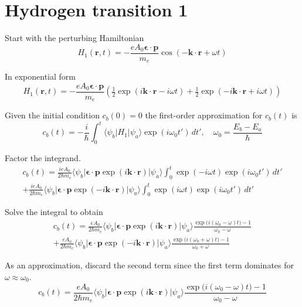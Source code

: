 

\section*{Hydrogen transition 1}

Start with the perturbing Hamiltonian
\begin{equation*}
H_1(\mathbf r,t)=-\frac{eA_0\boldsymbol{\epsilon}\cdot\mathbf p}{m_e}
\cos(-\mathbf k\cdot\mathbf r+\omega t)
\end{equation*}

In exponential form
\begin{equation*}
H_1(\mathbf r,t)=-\frac{eA_0\boldsymbol{\epsilon}\cdot\mathbf p}{m_e}
\left(\tfrac{1}{2}\exp(i\mathbf k\cdot\mathbf r-i\omega t)
+\tfrac{1}{2}\exp(-i\mathbf k\cdot\mathbf r+i\omega t)\right)
\end{equation*}

Given the initial condition $c_b(0)=0$ the first-order approximation for $c_b(t)$ is
\begin{equation*}
c_b(t)=-\frac{i}{\hbar}\int_0^t
\langle\psi_b|H_1|\psi_a\rangle\exp(i\omega_0t')\,dt',\quad
\omega_0=\frac{E_b-E_a}{\hbar}
\end{equation*}

Factor the integrand.
\begin{multline*}
c_b(t)
=\frac{ieA_0}{2\hbar m_e}
\langle\psi_b|\boldsymbol{\epsilon}\cdot\mathbf p\exp(i\mathbf k\cdot\mathbf r)|\psi_a\rangle
\int_0^t\exp(-i\omega t)\exp(i\omega_0t')\,dt'
\\
+\frac{ieA_0}{2\hbar m_e}
\langle\psi_b|\boldsymbol{\epsilon}\cdot\mathbf p\exp(-i\mathbf k\cdot\mathbf r)|\psi_a\rangle
\int_0^t\exp(i\omega t)\exp(i\omega_0t')\,dt'
\end{multline*}

Solve the integral to obtain
\begin{multline*}
c_b(t)=\frac{eA_0}{2\hbar m_e}
\langle\psi_b|\boldsymbol{\epsilon}\cdot\mathbf p\exp(i\mathbf k\cdot\mathbf r)|\psi_a\rangle
\frac{\exp\bigl(i(\omega_0-\omega)t\bigr)-1}{\omega_0-\omega}
\\
+\frac{eA_0}{2\hbar m_e}
\langle\psi_b|\boldsymbol{\epsilon}\cdot\mathbf p\exp(-i\mathbf k\cdot\mathbf r)|\psi_a\rangle
\frac{\exp\bigl(i(\omega_0+\omega)t\bigr)-1}{\omega_0+\omega}
\tag{1}
\end{multline*}

As an approximation, discard the second term since the first term
dominates for $\omega\approx\omega_0$.
\begin{equation*}
c_b(t)=\frac{eA_0}{2\hbar m_e}
\langle\psi_b|\boldsymbol{\epsilon}\cdot\mathbf p\exp(i\mathbf k\cdot\mathbf r)|\psi_a\rangle
\frac{\exp\bigl(i(\omega_0-\omega)t\bigr)-1}{\omega_0-\omega}
\end{equation*}

